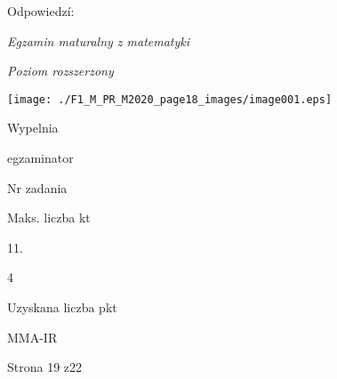 \documentclass[a4paper,12pt]{article}
\begin{document}
Odpowiedzí:

{\it Egzamin maturalny z matematyki}

{\it Poziom rozszerzony}
\begin{center}
\texttt{[image: ./F1\_M\_PR\_M2020\_page18\_images/image001.eps]}
\end{center}
Wypelnia

egzaminator

Nr zadania

Maks. liczba kt

11.

4

Uzyskana liczba pkt

MMA-IR

Strona 19 z22
\end{document}
